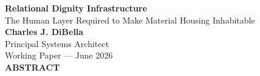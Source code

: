 \documentclass[12pt, letterpaper]{article}
\begin{document}
\captionsetup[table]{labelfont=normalfont, labelsep=period, skip=6pt}

\begin{titlepage}
\begin{center}
{\LARGE \textbf{Relational Dignity Infrastructure}}\\[6pt]
{\large The Human Layer Required to Make Material Housing Inhabitable}\\[0.5cm]
{\normalsize \textbf{Charles J. DiBella}}\\[0.01cm]
{\normalsize Principal Systems Architect}\\[0.01cm]
{\normalsize Working Paper --- June 2026}\\[0.3cm]
\textbf{ABSTRACT}
\vspace{0.2cm}
\end{center}
\begin{minipage}{0.95\textwidth}
\noindent


\end{minipage}
\end{titlepage}
\end{document}
